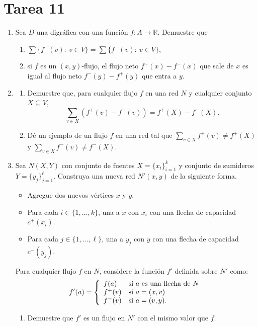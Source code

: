 \documentclass{article}
\begin{document}
\section*{\LARGE{Tarea 11}}
\begin{enumerate}
\item Sea $D$ una digr\'afica con una funci\'on $f\colon A \to \mathbb{R}$.
  Demuestre que
  \begin{enumerate}
  \item $\sum \{ f^+(v) \colon\  v \in V \} = \sum \{ f^-(v) \colon\ v \in V
    \}$,

  \item si $f$ es un $(x,y)$-flujo, el flujo neto $f^+(x) - f^-(x)$ que sale
    de $x$ es igual al flujo neto $f^-(y) - f^+(y)$ que entra a $y$.
  \end{enumerate}

\item \begin{enumerate}
\item Demuestre que, para cualquier flujo $f$ en una red $N$ y cualquier
  conjunto $X \subseteq V$, $$\sum_{v \in X} (f^+(v) - f^-(v)) = f^+(X) -
  f^-(X).$$

\item D\'e un ejemplo de un flujo $f$ en una red tal que $\sum_{v \in X}
  f^+(v) \ne f^+(X)$ y $\sum_{v \in X} f^-(v) \ne f^-(X)$.
\end{enumerate}

\item Sea $N(X,Y)$ con conjunto de fuentes $X = \{ x_i \}_{i = 1}^k$ y
  conjunto de sumideros $Y = \{ y_j \}_{j = 1}^\ell$. Construya una nueva red
  $N'(x,y)$ de la siguiente forma.
  \begin{itemize}
  \item Agregue dos nuevos v\'ertices $x$ y $y$.

  \item Para cada $i \in \{ 1, \dots, k \}$, una a $x$ con $x_i$ con una
    flecha de capacidad $c^+ (x_i)$.

  \item Para cada $j \in \{ 1, \dots, \ell \}$, una a $y_j$ con $y$ con una
    flecha de capacidad $c^- (y_j)$.
  \end{itemize}
  Para cualquier flujo $f$ en $N$, considere la funci\'on $f'$ definida sobre
  $N'$ como:
  \[f'(a) = \left\{
  \begin{array}{ll}
    f(a) & \textnormal{si } a \textnormal{ es una flecha de } N \\
    f^+(v) & \textnormal{si } a = (x,v) \\
    f^-(v) & \textnormal{si } a = (v,y).
  \end{array}
  \right.\]
  \begin{enumerate}
  \item Demuestre que $f'$ es un flujo en $N'$ con el mismo valor que $f$.


\end{enumerate}
\end{enumerate}
\end{document}
